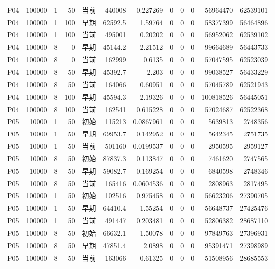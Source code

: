\documentclass[UTF8,a4paper,10pt,twocolumn,fontset=fandol]{ctexart}
\begin{document}
\begin{longtable}{@{}lrrrlrrrrrrr@{}}
P04 & 100000 & 1 & 50 & 当前 & 440008 & 0.227269 & 0 & 0 & 0 & 56964470 & 62539101 \\
P04 & 100000 & 1 & 100 & 早期 & 62592.5 & 1.59764 & 0 & 0 & 0 & 58377399 & 56464896 \\
P04 & 100000 & 1 & 100 & 当前 & 495001 & 0.20202 & 0 & 0 & 0 & 56952062 & 62539102 \\
P04 & 100000 & 8 & 0 & 早期 & 45144.2 & 2.21512 & 0 & 0 & 0 & 99664689 & 56443733 \\
P04 & 100000 & 8 & 0 & 当前 & 162999 & 0.6135 & 0 & 0 & 0 & 57047595 & 62523039 \\
P04 & 100000 & 8 & 50 & 早期 & 45392.7 & 2.203 & 0 & 0 & 0 & 99038527 & 56433229 \\
P04 & 100000 & 8 & 50 & 当前 & 164066 & 0.60951 & 0 & 0 & 0 & 57045789 & 62521943 \\
P04 & 100000 & 8 & 100 & 早期 & 45594.3 & 2.19326 & 0 & 0 & 0 & 100818526 & 56445051 \\
P04 & 100000 & 8 & 100 & 当前 & 162541 & 0.615228 & 0 & 0 & 0 & 57024687 & 62522368 \\
P05 & 10000 & 1 & 50 & 初始 & 115213 & 0.0867961 & 0 & 0 & 0 & 5639813 & 2748356 \\
P05 & 10000 & 1 & 50 & 早期 & 69953.7 & 0.142952 & 0 & 0 & 0 & 5642345 & 2751735 \\
P05 & 10000 & 1 & 50 & 当前 & 501160 & 0.0199537 & 0 & 0 & 0 & 2950595 & 2959127 \\
P05 & 10000 & 8 & 50 & 初始 & 87837.3 & 0.113847 & 0 & 0 & 0 & 7461620 & 2747565 \\
P05 & 10000 & 8 & 50 & 早期 & 59082.7 & 0.169254 & 0 & 0 & 0 & 6840598 & 2748346 \\
P05 & 10000 & 8 & 50 & 当前 & 165416 & 0.0604536 & 0 & 0 & 0 & 2808963 & 2817495 \\
P05 & 100000 & 1 & 50 & 初始 & 102516 & 0.975458 & 0 & 0 & 0 & 56623206 & 27390705 \\
P05 & 100000 & 1 & 50 & 早期 & 64410.4 & 1.55254 & 0 & 0 & 0 & 56648737 & 27425476 \\
P05 & 100000 & 1 & 50 & 当前 & 491447 & 0.203481 & 0 & 0 & 0 & 52806382 & 28687110 \\
P05 & 100000 & 8 & 50 & 初始 & 66632.1 & 1.50078 & 0 & 0 & 0 & 97849763 & 27396931 \\
P05 & 100000 & 8 & 50 & 早期 & 47851.4 & 2.0898 & 0 & 0 & 0 & 95391471 & 27398989 \\
P05 & 100000 & 8 & 50 & 当前 & 163066 & 0.61325 & 0 & 0 & 0 & 51508956 & 28685553 \\

\end{longtable}
\end{document}
